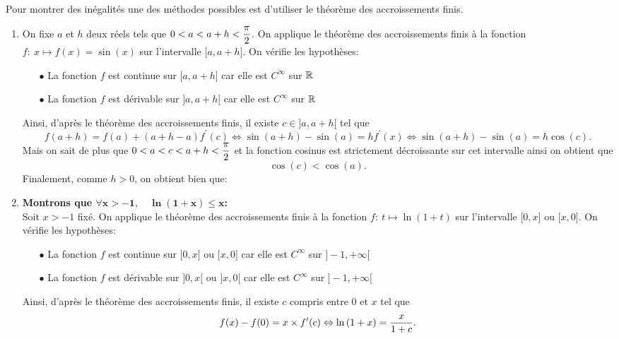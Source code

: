 \documentclass[a4paper, 11pt,reqno]{article}
\begin{document}
\begin{correction}  \;
	Pour montrer des in\'egalit\'es une des m\'ethodes possibles est d'utiliser le th\'eor\`eme des accroissements finis.
	\begin{enumerate}
		\item On fixe $a$ et $h$ deux r\'eels tels que $0<a<a+h<\displaystyle\frac{\pi}{2}$. On applique le th\'eor\`eme des accroissements finis \`a la fonction $f:\ x\mapsto f(x)=\sin{(x)}$ sur l'intervalle $\lbrack a,a+h\rbrack$. On v\'erifie les hypoth\`eses:
		      \begin{itemize}
			      \item[$\bullet$] La fonction $f$ est continue sur $\lbrack a,a+h\rbrack$ car elle est $C^{\infty}$ sur $\mathbb{R}$
			      \item[$\bullet$]  La fonction $f$ est d\'erivable sur $\rbrack a,a+h\lbrack$ car elle est $C^{\infty}$ sur $\mathbb{R}$
		      \end{itemize}
		      Ainsi, d'apr\`es le th\'eor\`eme des accroissements finis, il existe $c\in\rbrack a,a+h\lbrack$ tel que
		      $$f(a+h)=f(a)+(a+h-a)f^{\prime}(c)\Leftrightarrow \sin{(a+h)}-\sin{(a)}=hf^{\prime}(x)\Leftrightarrow \sin{(a+h)}-\sin{(a)}=h \cos{(c)}.$$
		      Mais on sait de plus que $0<a<c<a+h<\displaystyle\frac{\pi}{2}$ et la fonction cosinus est strictement d\'ecroissante sur cet intervalle ainsi on obtient que
		      $$\cos{(c)}< \cos{(a)}.$$
		      Finalement, comme $h>0$, on obtient bien que: 
		\item \textbf{Montrons que $\mathbf{\forall x>-1,\quad \ln{(1+x)}\leq x}$:}\\
		      \noindent Soit $x>-1$ fix\'e. On applique le th\'eor\`eme des accroissements finis \`a la fonction $f:\ t\mapsto \ln{(1+t)}$ sur l'intervalle $\lbrack 0,x\rbrack$ ou $\lbrack x,0\rbrack$. On v\'erifie les hypoth\`eses:
		      \begin{itemize}
			      \item[$\bullet$] La fonction $f$ est continue sur $\lbrack 0,x\rbrack$ ou $\lbrack x,0\rbrack$ car elle est $C^{\infty}$ sur $\rbrack -1,+\infty\lbrack$
			      \item[$\bullet$]  La fonction $f$ est d\'erivable sur $\rbrack 0,x\lbrack$ ou $\rbrack x,0\lbrack$ car elle est $C^{\infty}$ sur $\rbrack -1,+\infty\lbrack$
		      \end{itemize}
		      Ainsi, d'apr\`es le th\'eor\`eme des accroissements finis, il existe $c$ compris entre 0 et $x$ tel que
		      $$f(x)-f(0)=x\times f^{\prime}(c)\Leftrightarrow \ln{(1+x)}=\displaystyle\frac{x}{1+c}.$$

\end{enumerate}
\end{correction}
\end{document}
